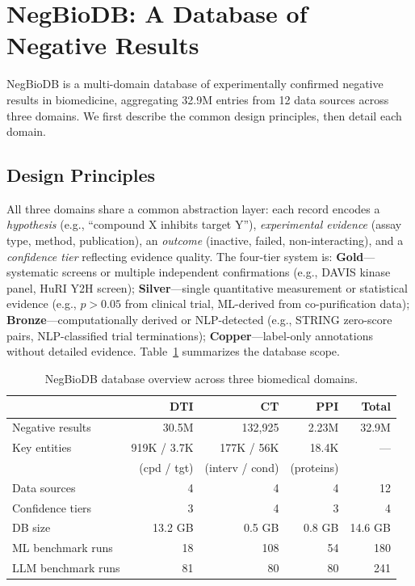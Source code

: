 \section{NegBioDB: A Database of Negative Results}
\label{sec:database}

NegBioDB is a multi-domain database of experimentally confirmed negative results in biomedicine, aggregating 32.9M entries from 12 data sources across three domains. We first describe the common design principles, then detail each domain.

\subsection{Design Principles}

All three domains share a common abstraction layer: each record encodes a \emph{hypothesis} (e.g., ``compound X inhibits target Y''), \emph{experimental evidence} (assay type, method, publication), an \emph{outcome} (inactive, failed, non-interacting), and a \emph{confidence tier} reflecting evidence quality. The four-tier system is:
\textbf{Gold}---systematic screens or multiple independent confirmations (e.g., DAVIS kinase panel, HuRI Y2H screen);
\textbf{Silver}---single quantitative measurement or statistical evidence (e.g., $p>0.05$ from clinical trial, ML-derived from co-purification data);
\textbf{Bronze}---computationally derived or NLP-detected (e.g., STRING zero-score pairs, NLP-classified trial terminations);
\textbf{Copper}---label-only annotations without detailed evidence.
Table~\ref{tab:overview} summarizes the database scope.

\begin{table}[t]
\centering
\caption{NegBioDB database overview across three biomedical domains.}
\label{tab:overview}
\small
\begin{tabular}{@{}lrrrr@{}}
\toprule
 & \textbf{DTI} & \textbf{CT} & \textbf{PPI} & \textbf{Total} \\
\midrule
Negative results     & 30.5M   & 132,925  & 2.23M   & 32.9M \\
Key entities         & 919K / 3.7K & 177K / 56K & 18.4K & --- \\
                     & \scriptsize{(cpd / tgt)} & \scriptsize{(interv / cond)} & \scriptsize{(proteins)} & \\
Data sources         & 4       & 4        & 4       & 12 \\
Confidence tiers     & 3       & 4        & 3       & 4 \\
DB size              & 13.2 GB & 0.5 GB   & 0.8 GB  & 14.6 GB \\
\midrule
ML benchmark runs    & 18      & 108      & 54      & 180 \\
LLM benchmark runs   & 81      & 80       & 80      & 241 \\
\bottomrule
\end{tabular}
\end{table}

